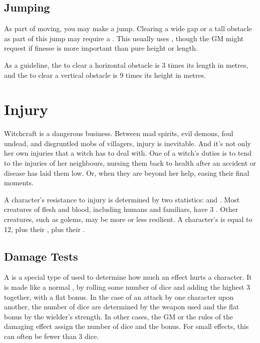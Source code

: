 \subsection{Jumping}

As part of moving, you may make a jump.
Clearing a wide gap or a tall obstacle as part of this jump may require a {\test}.
This {\test} usually uses , though the GM might request  if finesse is more important than pure height or length.

As a guideline, the {\tn} to clear a horizontal obstacle is 3 times its length in metres, and the {\tn} to clear a vertical obstacle is 9 times its height in metres.

\section{Injury}

Witchcraft is a dangerous business.
Between mad spirits, evil demons, foul undead, and disgruntled mobs of villagers, injury is inevitable.
And it's not only her own injuries that a witch has to deal with.
One of a witch's duties is to tend to the injuries of her neighbours, nursing them back to health after an accident or disease has laid them low.
Or, when they are beyond her help, easing their final moments.

A character's resistance to injury is determined by two statistics:  and .
Most creatures of flesh and blood, including humans and familiars, have 3 .
Other creatures, such as golems, may be more or less resilient.
A character's  is equal to 12, plus their , plus their .

\subsection{Damage Tests}

A {\damagetest} is a special type of {\test} used to determine how much an effect hurts a character.
It is made like a normal {\test}, by rolling some number of dice and adding the highest 3 together, with a flat bonus.
In the case of an attack by one character upon another, the number of dice are determined by the weapon used and the flat bonus by the wielder's strength.
In other cases, the GM or the rules of the damaging effect assign the number of dice and the bonus.
For small effects, this can often be fewer than 3 dice.


